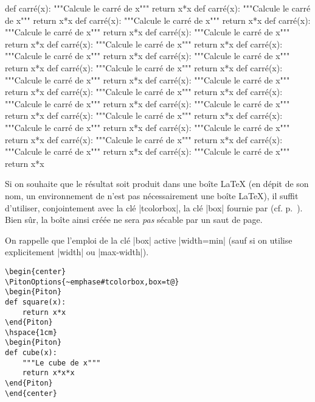 \documentclass[dvipsnames,svgnames]{article}
\begin{document}
\begin{Piton}[tcolorbox,width=min,splittable=3]
def carré(x):
    """Calcule le carré de x"""
    return x*x
def carré(x):
    """Calcule le carré de x"""
    return x*x
def carré(x):
    """Calcule le carré de x"""
    return x*x
def carré(x):
    """Calcule le carré de x"""
    return x*x
def carré(x):
    """Calcule le carré de x"""
    return x*x
def carré(x):
    """Calcule le carré de x"""
    return x*x
def carré(x):
    """Calcule le carré de x"""
    return x*x
def carré(x):
    """Calcule le carré de x"""
    return x*x
def carré(x):
    """Calcule le carré de x"""
    return x*x
def carré(x):
    """Calcule le carré de x"""
    return x*x
def carré(x):
    """Calcule le carré de x"""
    return x*x
def carré(x):
    """Calcule le carré de x"""
    return x*x
def carré(x):
    """Calcule le carré de x"""
    return x*x
def carré(x):
    """Calcule le carré de x"""
    return x*x
def carré(x):
    """Calcule le carré de x"""
    return x*x
def carré(x):
    """Calcule le carré de x"""
    return x*x
def carré(x):
    """Calcule le carré de x"""
    return x*x
def carré(x):
    """Calcule le carré de x"""
    return x*x
def carré(x):
    """Calcule le carré de x"""
    return x*x
def carré(x):
    """Calcule le carré de x"""
    return x*x
\end{Piton}



\bigskip
Si on souhaite que le résultat soit produit dans une boîte LaTeX (en dépit de son nom,
un environnement de  n'est pas nécessairement une boîte LaTeX),
il suffit d'utiliser, conjointement avec la clé |tcolorbox|, la clé |box| fournie
par  (cf. p.~\pageref{box}). Bien sûr, la boîte ainsi créée ne sera \emph{pas}
sécable par un saut de page.

On rappelle que l'emploi de la clé |box| active |width=min| (sauf si on utilise
explicitement |width| ou |max-width|).

\smallskip
\begin{Verbatim}
\begin{center}
\PitonOptions{~emphase#tcolorbox,box=t@}
\begin{Piton}
def square(x):
    return x*x
\end{Piton}
\hspace{1cm}
\begin{Piton}
def cube(x):
    """Le cube de x"""
    return x*x*x
\end{Piton}
\end{center}
\end{Verbatim}
\end{document}
